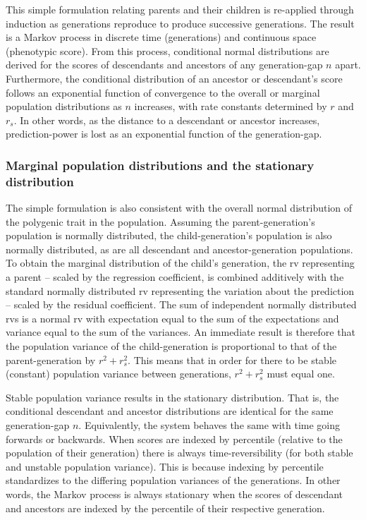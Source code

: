 \documentclass[a4paper,11pt]{article} %
\begin{document}
This simple formulation relating parents and their children is re-applied through induction as generations reproduce to produce successive generations. The result is a Markov process in discrete time (generations) and continuous space (phenotypic score). From this process, conditional normal distributions are derived for the scores of descendants and ancestors of any generation-gap $n$ apart. Furthermore, the conditional distribution of an ancestor or descendant's score follows an exponential function of convergence to the overall or marginal population distributions as $n$ increases, with rate constants determined by $r$ and $r_s$. In other words, as the distance to a descendant or ancestor increases, prediction-power is lost as an exponential function of the generation-gap. 


\subsubsection*{Marginal population distributions and the stationary distribution}

The simple formulation is also consistent with the overall normal distribution of the polygenic trait in the population. Assuming the parent-generation's population is normally distributed, the child-generation's population is also normally distributed, as are all descendant and ancestor-generation populations. To obtain the marginal distribution of the child's generation, the rv representing a parent -- scaled by the regression coefficient, is combined additively with the standard normally distributed rv representing the variation about the prediction -- scaled by the residual coefficient. The sum of independent normally distributed rvs is a normal rv with expectation equal to the sum of the expectations and variance equal to the sum of the variances. An immediate result is therefore that the population variance of the child-generation is proportional to that of the parent-generation by $r^2 + r_s^2$. This means that in order for there to be stable (constant) population variance between generations, $r^2 + r_s^2$ must equal one. 

Stable population variance results in the stationary distribution. That is, the conditional descendant and ancestor distributions are identical for the same generation-gap $n$. Equivalently, the system behaves the same with time going forwards or backwards. When scores are indexed by percentile (relative to the population of their generation) there is always time-reversibility (for both stable and unstable population variance). This is because indexing by percentile standardizes to the differing population variances of the generations. In other words, the Markov process is always stationary when the scores of descendant and ancestors are indexed by the percentile of their respective generation. 
\end{document}
